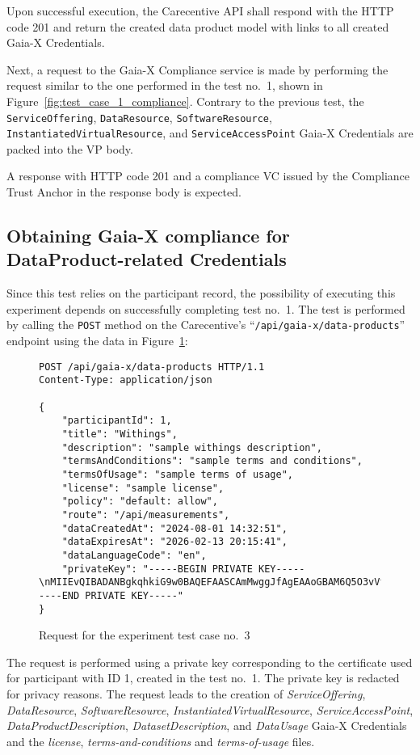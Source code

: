 Upon successful execution, the Carecentive API shall respond with the HTTP code 201 and return the created data product model with links to all created Gaia-X Credentials.

Next, a request to the Gaia-X Compliance service is made by performing the request similar to the one performed in the test no.~1, shown in Figure~\ref{fig:test_case_1_compliance}.
Contrary to the previous test, the \texttt{ServiceOffering}, \texttt{DataResource}, \texttt{SoftwareResource}, \texttt{InstantiatedVirtualResource}, and \texttt{ServiceAccessPoint} Gaia-X Credentials are packed into the VP body.

A response with HTTP code 201 and a compliance VC issued by the Compliance Trust Anchor in the response body is expected.

\subsection{Obtaining Gaia-X compliance for DataProduct-related Credentials}\label{subsec:data-product-compliance}

Since this test relies on the participant record, the possibility of executing this experiment depends on successfully completing test no.~1.
The test is performed by calling the \texttt{POST} method on the Carecentive's ``\texttt{/api/gaia-x/data-products}'' endpoint using the data in Figure~\ref{fig:test_case_3}:

\begin{figure}[h]
    \centering
    \begin{verbatim}
POST /api/gaia-x/data-products HTTP/1.1
Content-Type: application/json

{
    "participantId": 1,
	"title": "Withings",
	"description": "sample withings description",
	"termsAndConditions": "sample terms and conditions",
	"termsOfUsage": "sample terms of usage",
	"license": "sample license",
	"policy": "default: allow",
	"route": "/api/measurements",
	"dataCreatedAt": "2024-08-01 14:32:51",
	"dataExpiresAt": "2026-02-13 20:15:41",
	"dataLanguageCode": "en",
	"privateKey": "-----BEGIN PRIVATE KEY-----\nMIIEvQIBADANBgkqhkiG9w0BAQEFAASCAmMwggJfAgEAAoGBAM6Q5O3vVfnxk6P7\n...\nYWw+HiFJh9XQpRUtv9PV8L8AqFFfMdsOpT6pgC+aA/WB\n-----END PRIVATE KEY-----"
}
    \end{verbatim}
    \caption{Request for the experiment test case no.~3}\label{fig:test_case_3}
\end{figure}

The request is performed using a private key corresponding to the certificate used for participant with ID 1, created in the test no.~1.
The private key is redacted for privacy reasons.
The request leads to the creation of \textit{ServiceOffering}, \textit{DataResource}, \textit{SoftwareResource}, \textit{InstantiatedVirtualResource}, \textit{ServiceAccessPoint}, \textit{DataProductDescription}, \textit{DatasetDescription}, and \textit{DataUsage} Gaia-X Credentials and the \textit{license}, \textit{terms-and-conditions} and \textit{terms-of-usage} files.

